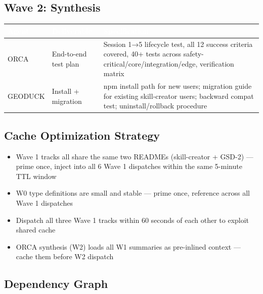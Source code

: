 \documentclass[11pt,letterpaper]{article}
\newcommand{\tableheader}[1]{\textbf{\sffamily\textcolor{white}{#1}}}
\begin{document}
\subsection{Wave 2: Synthesis}

\begin{center}
\begin{tabularx}{\textwidth}{L{2.5cm}L{3cm}X}
\toprule
{}
\tableheader{Agent} & \tableheader{Deliverable} & \tableheader{Specification} \\
\midrule
ORCA & End-to-end test plan & Session 1→5 lifecycle test, all 12 success criteria covered, 40+ tests across safety-critical/core/integration/edge, verification matrix \\
GEODUCK & Install + migration & npm install path for new users; migration guide for existing skill-creator users; backward compat test; uninstall/rollback procedure \\
\bottomrule
\end{tabularx}
\end{center}

\subsection{Cache Optimization Strategy}

\begin{itemize}
  \item Wave 1 tracks all share the same two READMEs (skill-creator + GSD-2) --- prime once, inject into all 6 Wave 1 dispatches within the same 5-minute TTL window
  \item W0 type definitions are small and stable --- prime once, reference across all Wave 1 dispatches
  \item Dispatch all three Wave 1 tracks within 60 seconds of each other to exploit shared cache
  \item ORCA synthesis (W2) loads all W1 summaries as pre-inlined context --- cache them before W2 dispatch
\end{itemize}

\subsection{Dependency Graph}
\end{document}
